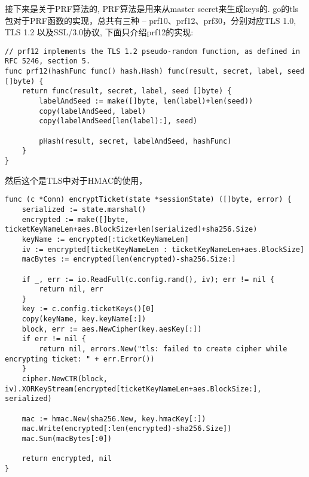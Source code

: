 \documentclass[a4paper]{ctexart}
\begin{document}
接下来是关于PRF算法的, PRF算法是用来从master secret来生成keys的. go的tls包对于PRF函数的实现，总共有三种 -- prf10、prf12、prf30，分别对应TLS 1.0, TLS 1.2 以及SSL/3.0协议,
下面只介绍prf12的实现:
\begin{lstlisting}[frame=single, stepnumber=5, firstnumber=1, caption={prf12的实现}]
// prf12 implements the TLS 1.2 pseudo-random function, as defined in RFC 5246, section 5.
func prf12(hashFunc func() hash.Hash) func(result, secret, label, seed []byte) {
	return func(result, secret, label, seed []byte) {
		labelAndSeed := make([]byte, len(label)+len(seed))
		copy(labelAndSeed, label)
		copy(labelAndSeed[len(label):], seed)

		pHash(result, secret, labelAndSeed, hashFunc)
	}
}
\end{lstlisting}



然后这个是TLS中对于HMAC的使用，
\begin{lstlisting}[frame=single, stepnumber=5, firstnumber=1, caption={TLS中Hmac的使用}]
func (c *Conn) encryptTicket(state *sessionState) ([]byte, error) {
	serialized := state.marshal()
	encrypted := make([]byte, ticketKeyNameLen+aes.BlockSize+len(serialized)+sha256.Size)
	keyName := encrypted[:ticketKeyNameLen]
	iv := encrypted[ticketKeyNameLen : ticketKeyNameLen+aes.BlockSize]
	macBytes := encrypted[len(encrypted)-sha256.Size:]

	if _, err := io.ReadFull(c.config.rand(), iv); err != nil {
		return nil, err
	}
	key := c.config.ticketKeys()[0]
	copy(keyName, key.keyName[:])
	block, err := aes.NewCipher(key.aesKey[:])
	if err != nil {
		return nil, errors.New("tls: failed to create cipher while encrypting ticket: " + err.Error())
	}
	cipher.NewCTR(block, iv).XORKeyStream(encrypted[ticketKeyNameLen+aes.BlockSize:], serialized)

	mac := hmac.New(sha256.New, key.hmacKey[:])
	mac.Write(encrypted[:len(encrypted)-sha256.Size])
	mac.Sum(macBytes[:0])

	return encrypted, nil
}

\end{lstlisting}
\end{document}
